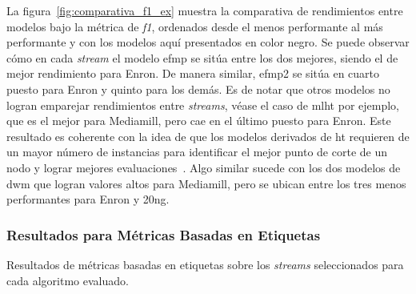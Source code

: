 La figura~\ref{fig:comparativa_f1_ex} muestra la comparativa de rendimientos
entre modelos bajo la métrica de \textit{f1}, ordenados desde el menos
performante al más performante y con los modelos aquí presentados en color
negro. Se puede observar cómo en cada \textit{stream} el modelo \acrshort{efmp}
se sitúa entre los dos mejores, siendo el de mejor rendimiento para Enron. De
manera similar, \acrshort{efmp2} se sitúa en cuarto puesto para Enron y quinto
para los demás. Es de notar que otros modelos no logran emparejar rendimientos
entre \textit{streams}, véase el caso de \acrshort{mlht} por ejemplo, que es el
mejor para Mediamill, pero cae en el último puesto para Enron. Este resultado es
coherente con la idea de que los modelos derivados de \acrlong{ht} requieren de
un mayor número de instancias para identificar el mejor punto de corte de un
nodo y lograr mejores evaluaciones~\cite{read_scalable_2012}. Algo similar
sucede con los dos modelos de \acrshort{dwm} que logran valores altos para
Mediamill, pero se ubican entre los tres menos performantes para Enron y 20ng.

\subsubsection{Resultados para Métricas Basadas en Etiquetas}

\begin{table}[htbp]
	\centering
	\begin{adjustbox}{max width=\textwidth}
		
	\end{adjustbox}
	\begin{adjustbox}{max width=\textwidth}
		
	\end{adjustbox}
	\caption{Resultados de métricas basadas en etiquetas sobre los
		\textit{streams} seleccionados para cada algoritmo evaluado.}
	\label{tab:label_based}
\end{table}

